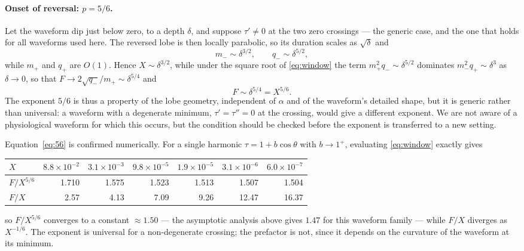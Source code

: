 \documentclass[11pt,a4paper]{article}
\begin{document}
\paragraph{Onset of reversal: $p=5/6$.}
Let the waveform dip just below zero, to a depth $\delta$, and suppose
$\tau'\neq0$ at the two zero crossings --- the generic case, and the one that
holds for all waveforms used here. The reversed lobe is then locally
parabolic, so its duration scales as $\sqrt\delta$ and
\begin{equation}
m_-\sim\delta^{3/2},\qquad q_-\sim\delta^{5/2},
\end{equation}
while $m_+$ and $q_+$ are $O(1)$. Hence $X\sim\delta^{3/2}$, while under the
square root of \eqref{eq:window} the term $m_+^2q_-\sim\delta^{5/2}$
dominates $m_-^2q_+\sim\delta^{3}$ as $\delta\to0$, so that
$F\to2\sqrt{q_-}/m_+\sim\delta^{5/4}$ and
\begin{equation}
F\sim\delta^{5/4}=X^{5/6}.
\label{eq:56}
\end{equation}
The exponent $5/6$ is thus a property of the lobe geometry, independent of
$\alpha$ and of the waveform's detailed shape, but it is generic rather than
universal: a waveform with a degenerate minimum, $\tau'=\tau''=0$ at the
crossing, would give a different exponent. We are not aware of a
physiological waveform for which this occurs, but the condition should be
checked before the exponent is transferred to a new setting.

Equation~\eqref{eq:56} is confirmed numerically. For a single harmonic
$\tau=1+b\cos\theta$ with $b\to1^+$, evaluating \eqref{eq:window} exactly
gives
\begin{center}
\begin{tabular}{l r r r r r r}
\toprule
$X$ & $8.8\times10^{-2}$ & $3.1\times10^{-3}$ & $9.8\times10^{-5}$ &
$1.9\times10^{-5}$ & $3.1\times10^{-6}$ & $6.0\times10^{-7}$\\
\midrule
$F/X^{5/6}$ & 1.710 & 1.575 & 1.523 & 1.513 & 1.507 & 1.504\\
$F/X$       & 2.57  & 4.13  & 7.09  & 9.26  & 12.47 & 16.37\\
\bottomrule
\end{tabular}
\end{center}
so $F/X^{5/6}$ converges to a constant $\approx1.50$ --- the asymptotic
analysis above gives $1.47$ for this waveform family --- while $F/X$ diverges
as $X^{-1/6}$. The exponent is universal for a non-degenerate crossing; the
prefactor is not, since it depends on the curvature of the waveform at its
minimum.
\end{document}
